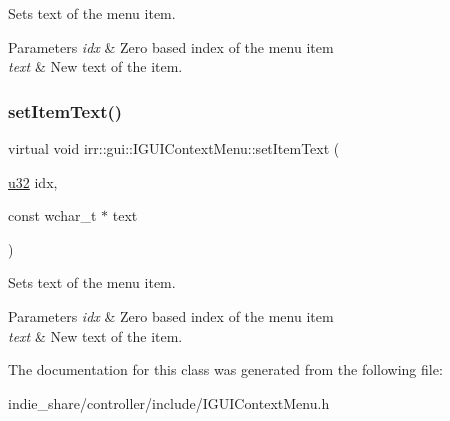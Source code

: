 Sets text of the menu item. 


\begin{DoxyParams}{Parameters}
{\em idx} & Zero based index of the menu item \\
\hline
{\em text} & New text of the item. \\
\hline
\end{DoxyParams}
\mbox{\label{classirr_1_1gui_1_1IGUIContextMenu_a20d0e53213a2915a8a62c54b5aa2ff08}} 
\subsubsection{\texorpdfstring{set\+Item\+Text()}{setItemText()}\hspace{0.1cm}{\footnotesize\ttfamily [2/2]}}
{\footnotesize\ttfamily virtual void irr\+::gui\+::\+I\+G\+U\+I\+Context\+Menu\+::set\+Item\+Text (\begin{DoxyParamCaption}\item[{\hyperlink{namespaceirr_a0416a53257075833e7002efd0a18e804}{u32}}]{idx,  }\item[{const wchar\+\_\+t $\ast$}]{text }\end{DoxyParamCaption})\hspace{0.3cm}{\ttfamily [pure virtual]}}



Sets text of the menu item. 


\begin{DoxyParams}{Parameters}
{\em idx} & Zero based index of the menu item \\
\hline
{\em text} & New text of the item. \\
\hline
\end{DoxyParams}


The documentation for this class was generated from the following file\+:\begin{DoxyCompactItemize}
\item 
indie\+\_\+share/controller/include/I\+G\+U\+I\+Context\+Menu.\+h\end{DoxyCompactItemize}
